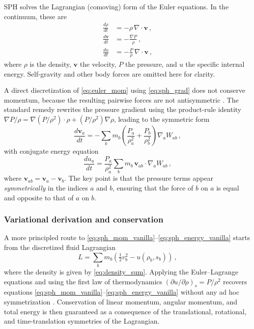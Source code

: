 SPH solves the Lagrangian (comoving) form of the Euler equations. In the continuum, these are
\begin{align}
    \frac{d\rho}{dt}   &= -\rho \, \nabla \cdot \mathbf{v}\,, \label{eq:euler_cont} \\
    \frac{d\mathbf{v}}{dt} &= -\frac{\nabla P}{\rho}\,, \label{eq:euler_mom} \\
    \frac{du}{dt}       &= -\frac{P}{\rho} \, \nabla \cdot \mathbf{v}\,, \label{eq:euler_energy}
\end{align}
where $\rho$ is the density, $\mathbf{v}$ the velocity, $P$ the pressure, and $u$ the specific internal energy. Self-gravity and other body forces are omitted here for clarity.

A direct discretization of \eqref{eq:euler_mom} using \eqref{eq:sph_grad} does not conserve momentum, because the resulting pairwise forces are not antisymmetric \cite{Rosswog2009}. The standard remedy rewrites the pressure gradient using the product-rule identity $\nabla P / \rho = \nabla(P/\rho^2) \cdot \rho + (P/\rho^2)\nabla\rho$, leading to the symmetric form
\begin{equation}
    \frac{d\mathbf{v}_a}{dt} = -\sum_b m_b \left( \frac{P_a}{\rho_a^2} + \frac{P_b}{\rho_b^2} \right) \nabla_a W_{ab}\,,
    \label{eq:sph_mom_vanilla}
\end{equation}
with conjugate energy equation
\begin{equation}
    \frac{du_a}{dt} = \frac{P_a}{\rho_a^2} \sum_b m_b \, \mathbf{v}_{ab} \cdot \nabla_a W_{ab}\,,
    \label{eq:sph_energy_vanilla}
\end{equation}
where $\mathbf{v}_{ab} = \mathbf{v}_a - \mathbf{v}_b$. The key point is that the pressure terms appear \emph{symmetrically} in the indices $a$ and $b$, ensuring that the force of $b$ on $a$ is equal and opposite to that of $a$ on $b$.


\subsubsection*{Variational derivation and conservation}

A more principled route to \eqref{eq:sph_mom_vanilla}--\eqref{eq:sph_energy_vanilla} starts from the discretized fluid Lagrangian
\begin{equation}
    L = \sum_b m_b \left( \tfrac{1}{2} v_b^2 - u(\rho_b, s_b) \right)\,,
    \label{eq:sph_lagrangian}
\end{equation}
where the density is given by \eqref{eq:density_sum}. Applying the Euler--Lagrange equations and using the first law of thermodynamics $(\partial u / \partial \rho)_s = P / \rho^2$ recovers equations \eqref{eq:sph_mom_vanilla}--\eqref{eq:sph_energy_vanilla} without any ad hoc symmetrization \cite{Rosswog2009}. Conservation of linear momentum, angular momentum, and total energy is then guaranteed as a consequence of the translational, rotational, and time-translation symmetries of the Lagrangian.

